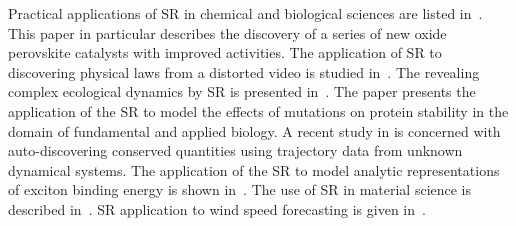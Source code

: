 \documentclass{bmcart}
\begin{document}
Practical applications of SR in chemical and biological sciences are listed in~\cite{weng2020simple}. This paper in particular describes the discovery of a series of new oxide perovskite catalysts with improved activities. The application of SR to discovering physical laws from a distorted video is studied in~\cite{udrescu2021symbolic}. The revealing complex ecological dynamics by SR is presented in~\cite{chen2019revealing}. The paper \cite{louis2021reviewing} presents the application of the SR to model the effects of mutations on protein stability in the domain of fundamental and applied biology. A recent study in \cite{liu2021machine} is concerned with auto-discovering conserved quantities using trajectory data from unknown dynamical systems. The application of the SR to model analytic representations of exciton binding energy is shown in~\cite{liang2019phillips}. The use of SR in material science is described in~\cite{wang2019symbolic,wang2022symbolic,burlacu2022symbolic,kabliman2021application}. SR application to wind speed forecasting is given in~\cite{abdellaoui2021symbolic}. 
\end{document}
